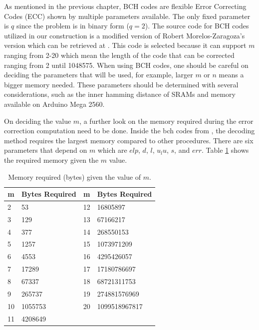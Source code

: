 As mentioned in the previous chapter, BCH codes are flexible Error Correcting Codes (ECC) shown by multiple parameters available. The only fixed parameter is $q$ since the problem is in binary form ($q=2$). The source code for BCH codes utilized in our construction is a modified version of Robert Morelos-Zaragoza's version which can be retrieved at \cite{bch_code}. This code is selected because it can support $m$ ranging from 2-20 which mean the length of the code that can be corrected ranging from 2 until 1048575. When using BCH codes, one should be careful on deciding the parameters that will be used, for example, larger $m$ or $n$ means a bigger memory needed.
These parameters should be determined with several considerations, such as the inner hamming distance of SRAMs and memory available on Arduino Mega 2560.

On deciding the value $m$, a further look on the memory required during the error correction computation need to be done. Inside the bch codes from \cite{bch_code}, the decoding method requires the largest memory compared to other procedures. There are six parameters that depend on $m$ which are $elp$, $d$, $l$, $u_lu$, $s$, and $err$. Table \ref{tab:memorybch} shows the required memory given the $m$ value.

\begin{table}[htbp]
  \centering
  \caption{Memory required (bytes) given the value of $m$.}
    \begin{tabular}{|l|l|l|l|}
    \hline
    \multicolumn{1}{|c|}{\textbf{m}} & \multicolumn{1}{c|}{\textbf{Bytes Required}} & \multicolumn{1}{c|}{\textbf{m}} & \multicolumn{1}{c|}{\textbf{Bytes Required}} \\
    \hline
    2     & 53    & 12    & 16805897 \\
    \hline
    3     & 129   & 13    & 67166217 \\
    \hline
    4     & 377   & 14    & 268550153 \\
    \hline
    5     & 1257  & 15    & 1073971209 \\
    \hline
    6     & 4553  & 16    & 4295426057 \\
    \hline
    7     & 17289 & 17    & 17180786697 \\
    \hline
    8     & 67337 & 18    & 68721311753 \\
    \hline
    9     & 265737 & 19    & 274881576969 \\
    \hline
    10    & 1055753 & 20    & 1099518967817 \\
    \hline
    11    & 4208649 &       &  \\
    \hline
    \end{tabular}%
  \label{tab:memorybch}%
\end{table}%

